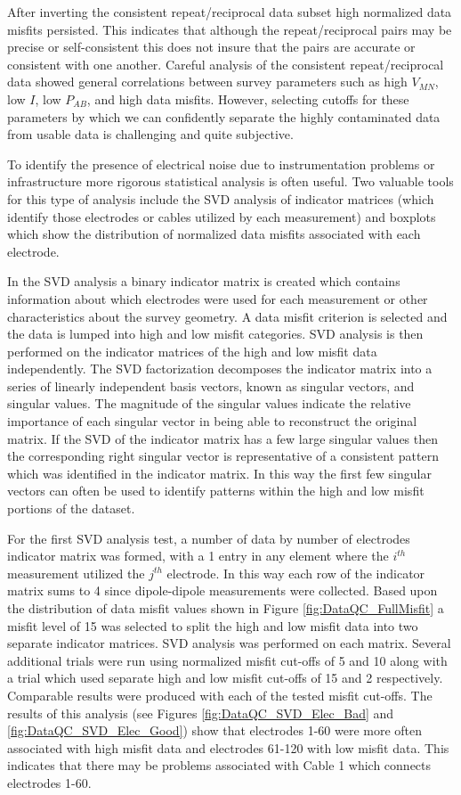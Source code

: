 \documentclass[final,authoryear,5p,times,twocolumn]{elsarticle}
\begin{document}
After inverting the consistent repeat/reciprocal data subset high normalized data misfits persisted. This indicates that although the repeat/reciprocal pairs may be precise or self-consistent this does not insure that the pairs are accurate or consistent with one another. Careful analysis of the consistent repeat/reciprocal data showed general correlations between survey parameters such as high $V_{MN}$, low $I$, low $P_{AB}$, and high data misfits. However, selecting cutoffs for these parameters by which we can confidently separate the highly contaminated data from usable data is challenging and quite subjective.

To identify the presence of electrical noise due to instrumentation problems or infrastructure more rigorous statistical analysis is often useful. Two valuable tools for this type of analysis include the SVD analysis of indicator matrices (which identify those electrodes or cables utilized by each measurement) and boxplots which show the distribution of normalized data misfits associated with each electrode.

In the SVD analysis a binary indicator matrix is created which contains information about which electrodes were used for each measurement or other characteristics about the survey geometry. A data misfit criterion is selected and the data is lumped into high and low misfit categories. SVD analysis is then performed on the indicator matrices of the high and low misfit data independently. The SVD factorization decomposes the indicator matrix into a series of linearly independent basis vectors, known as singular vectors, and singular values. The magnitude of the singular values indicate the relative importance of each singular vector in being able to reconstruct the original matrix. If the SVD of the indicator matrix has a few large singular values then the corresponding right singular vector is representative of a consistent pattern which was identified in the indicator matrix. In this way the first few singular vectors can often be used to identify patterns within the high and low misfit portions of the dataset.

For the first SVD analysis test, a number of data by number of electrodes indicator matrix was formed, with a 1 entry in any element where the $i^{th}$ measurement utilized the $j^{th}$ electrode. In this way each row of the indicator matrix sums to 4 since dipole-dipole measurements were collected. Based upon the distribution of data misfit values shown in Figure \ref{fig:DataQC_FullMisfit} a misfit level of 15 was selected to split the high and low misfit data into two separate indicator matrices. SVD analysis was performed on each matrix. Several additional trials were run using normalized misfit cut-offs of 5 and 10 along with a trial which used separate high and low misfit cut-offs of 15 and 2 respectively. Comparable results were produced with each of the tested misfit cut-offs. The results of this analysis (see Figures \ref{fig:DataQC_SVD_Elec_Bad} and \ref{fig:DataQC_SVD_Elec_Good}) show that electrodes 1-60 were more often associated with high misfit data and electrodes 61-120 with low misfit data. This indicates that there may be problems associated with Cable 1 which connects electrodes 1-60.
\end{document}
